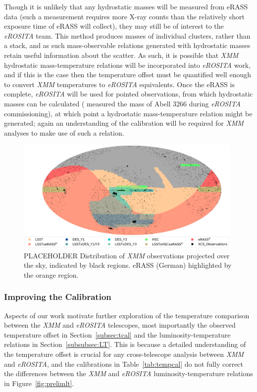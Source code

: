 \documentclass[fleqn,usenatbib]{mnras}
\begin{document}
Though it is unlikely that any hydrostatic masses will be measured from eRASS data (such a measurement requires more X-ray counts than the relatively short exposure time of eRASS will collect), they may still be of interest to the {\em eROSITA} team. This method produces masses of individual clusters, rather than a stack, and as such mass-observable relations generated with hydrostatic masses retain useful information about the scatter. As such, it is possible that {\em XMM} hydrostatic mass-temperature relations will be incorporated into {\em eROSITA} work, and if this is the case then the temperature offset must be quantified well enough to convert {\em XMM} temperatures to {\em eROSITA} equivalents. Once the eRASS is complete, {\em eROSITA} will be used for pointed observations, from which hydrostatic masses can be calculated (\cite{pointysanders} measured the mass of Abell 3266 during {\em eROSITA} commissioning), at which point a hydrostatic mass-temperature relation might be generated; again an understanding of the calibration will be required for {\em XMM} analyses to make use of such a relation.

\begin{figure}
    \centering
    \includegraphics[width=0.98\textwidth]{images/xmm_erass_footprint.png}
    \caption[]{{\color{red} PLACEHOLDER} Distribution of {\em XMM} observations projected over the sky, indicated by {\color{red} black} regions. eRASS (German) highlighted by the {\color{red} orange} region.} 
    \label{fig:germanerassxmm}
\end{figure}

\subsubsection{Improving the Calibration}
Aspects of our work motivate further exploration of the temperature comparison between the {\em XMM} and {\em eROSITA} telescopes, most importantly the observed temperature offset in Section~\ref{subsec:tcal} and the luminosity-temperature relations in Section~\ref{subsubsec:LT}. This is because a detailed understanding of the temperature offset is crucial for any cross-telescope analysis between {\em XMM} and {\em eROSITA}, and the calibrations in Table~\ref{tab:tempcal} do not fully correct the differences between the {\em XMM} and {\em eROSITA} luminosity-temperature relations in Figure~\ref{fig:prelimlt}.
\end{document}
